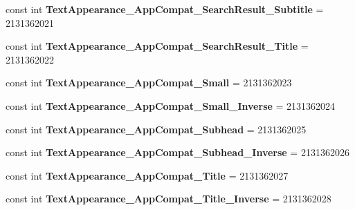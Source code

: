 \begin{DoxyCompactItemize}
\mbox{\label{class_pinned_app_1_1_droid_1_1_resource_1_1_style_a9bd1a056ac84d5605a842b05943c81de}} 
const int {\bfseries Text\+Appearance\+\_\+\+App\+Compat\+\_\+\+Search\+Result\+\_\+\+Subtitle} = 2131362021
\item 
\mbox{\label{class_pinned_app_1_1_droid_1_1_resource_1_1_style_a08777744670c7ea31b7dbfc0ba6293f6}} 
const int {\bfseries Text\+Appearance\+\_\+\+App\+Compat\+\_\+\+Search\+Result\+\_\+\+Title} = 2131362022
\item 
\mbox{\label{class_pinned_app_1_1_droid_1_1_resource_1_1_style_af118a9d91c5458d5204c479449281a6f}} 
const int {\bfseries Text\+Appearance\+\_\+\+App\+Compat\+\_\+\+Small} = 2131362023
\item 
\mbox{\label{class_pinned_app_1_1_droid_1_1_resource_1_1_style_a70c97fe47923a128913f2c204347b1c7}} 
const int {\bfseries Text\+Appearance\+\_\+\+App\+Compat\+\_\+\+Small\+\_\+\+Inverse} = 2131362024
\item 
\mbox{\label{class_pinned_app_1_1_droid_1_1_resource_1_1_style_ad38209b29cec05b28006bf4d42169761}} 
const int {\bfseries Text\+Appearance\+\_\+\+App\+Compat\+\_\+\+Subhead} = 2131362025
\item 
\mbox{\label{class_pinned_app_1_1_droid_1_1_resource_1_1_style_aca7f9a7ccdb6ff6d9e3a3a7ad5391efd}} 
const int {\bfseries Text\+Appearance\+\_\+\+App\+Compat\+\_\+\+Subhead\+\_\+\+Inverse} = 2131362026
\item 
\mbox{\label{class_pinned_app_1_1_droid_1_1_resource_1_1_style_a1c2c111a5debd241d80de5302c59a63e}} 
const int {\bfseries Text\+Appearance\+\_\+\+App\+Compat\+\_\+\+Title} = 2131362027
\item 
\mbox{\label{class_pinned_app_1_1_droid_1_1_resource_1_1_style_a3c868def842cad83a98866c1de779e62}} 
const int {\bfseries Text\+Appearance\+\_\+\+App\+Compat\+\_\+\+Title\+\_\+\+Inverse} = 2131362028

\end{DoxyCompactItemize}
